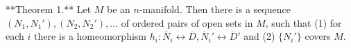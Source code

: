 **Theorem 1.** Let $M$ be an $n$-manifold. Then there is a sequence $(N_1, N_1'), (N_2, N_2'), \ldots$ of ordered pairs of open sets in $M$, such that (1) for each $i$ there is a homeomorphism $h_i: \overline{N}_i \leftrightarrow \overline{D}, \overline{N}_i' \leftrightarrow \overline{D}'$ and (2) $\{N_i'\}$ covers $M$.
